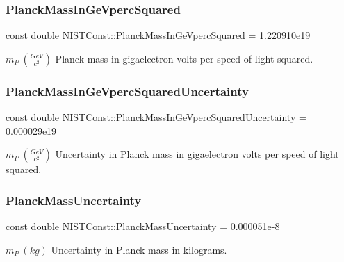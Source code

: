 \subsubsection{\texorpdfstring{Planck\+Mass\+In\+Ge\+Vperc\+Squared}{PlanckMassInGeVpercSquared}}
{\footnotesize\ttfamily const double N\+I\+S\+T\+Const\+::\+Planck\+Mass\+In\+Ge\+Vperc\+Squared = 1.\+220910e19}

$m_P \ (\frac{GeV}{c^2})$ Planck mass in gigaelectron volts per speed of light squared. \mbox{\label{group___planck_mass_gaab9eed84a649fb1ee6e90b2e15c86b0a}} 
\subsubsection{\texorpdfstring{Planck\+Mass\+In\+Ge\+Vperc\+Squared\+Uncertainty}{PlanckMassInGeVpercSquaredUncertainty}}
{\footnotesize\ttfamily const double N\+I\+S\+T\+Const\+::\+Planck\+Mass\+In\+Ge\+Vperc\+Squared\+Uncertainty = 0.\+000029e19}

$m_P \ (\frac{GeV}{c^2})$ Uncertainty in Planck mass in gigaelectron volts per speed of light squared. \mbox{\label{group___planck_mass_ga500eef372db7d6dcddd4a4a2d3e03b00}} 
\subsubsection{\texorpdfstring{Planck\+Mass\+Uncertainty}{PlanckMassUncertainty}}
{\footnotesize\ttfamily const double N\+I\+S\+T\+Const\+::\+Planck\+Mass\+Uncertainty = 0.\+000051e-\/8}

$m_P \ (kg)$ Uncertainty in Planck mass in kilograms. 